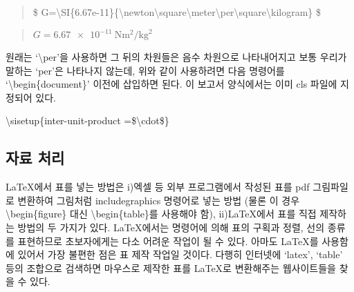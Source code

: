 \documentclass{gshs-report-v1.2}
\begin{document}
\begin{center}
	\begin{quote}
		\$ G=\textbackslash SI\{6.67e-11\}\{\textbackslash newton\textbackslash square\textbackslash meter\textbackslash per\textbackslash square\textbackslash kilogram\} \$
	\end{quote}
	
	\begin{quote}
		$ G=\SI{6.67e-11}{\newton\square\meter\per\square\kilogram} $
	\end{quote}
\end{center}

원래는 `\textbackslash per'을 사용하면 그 뒤의 차원들은 음수 차원으로 나타내어지고 보통 우리가 말하는 `per'은 나타나지 않는데,
위와 같이 사용하려면 다음 명령어를 `\textbackslash begin\{document\}' 이전에 삽입하면 된다.
이 보고서 양식에서는 이미 cls 파일에 지정되어 있다. 
\begin{center}
	\textbackslash sisetup\{inter-unit-product =\$\textbackslash cdot\$\}
\end{center}



\subsection{자료 처리}

\LaTeX 에서 표를 넣는 방법은 i)엑셀 등 외부 프로그램에서 작성된 표를 pdf 그림파일로 변환하여 그림처럼 includegraphics 명령어로 넣는 방법 (물론 이 경우 {\textbackslash}begin\{figure\} 대신 {\textbackslash}begin\{table\}를 사용해야 함), ii)\LaTeX 에서 표를 직접 제작하는 방법의 두 가지가 있다. \LaTeX 에서는 명령어에 의해 표의 구획과 정렬, 선의 종류를 표현하므로 초보자에게는 다소 어려운 작업이 될 수 있다. 아마도 \LaTeX 를 사용함에 있어서 가장 불편한 점은 표 제작 작업일 것이다. 다행히 인터넷에 `latex', `table' 등의 조합으로 검색하면 마우스로 제작한 표를 \LaTeX 로 변환해주는 웹사이트들을 찾을 수 있다.
\end{document}
